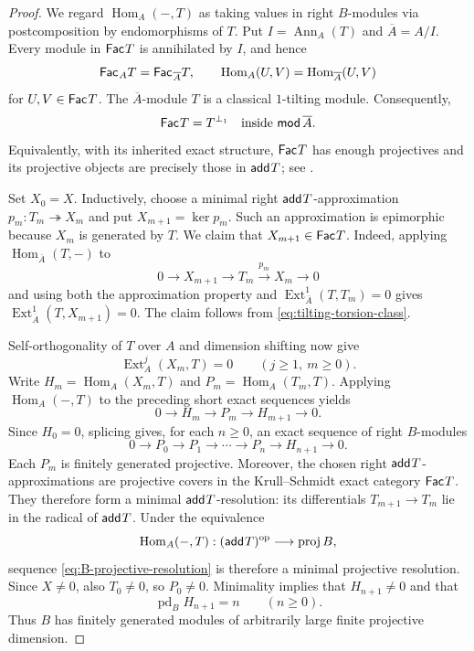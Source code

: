 \documentclass[a4paper,reqno]{amsart}
\theoremstyle{definition}
\newcommand{\Ext}{\operatorname{Ext}\nolimits}
\newcommand{\Hom}{\operatorname{Hom}\nolimits}
\newcommand{\Ann}{\operatorname{Ann}\nolimits}
\newcommand{\add}{\mathsf{add}\hspace{.01in}}
\newcommand{\Fac}{\mathsf{Fac}\hspace{.01in}}
\numberwithin{equation}{section}
\begin{document}
\begin{proof}
We regard $\Hom_A(-,T)$ as taking values in right $B$-modules via
postcomposition by endomorphisms of $T$.
Put $I=\Ann_A(T)$ and $\overline A=A/I$. Every module in $\Fac T$
is annihilated by $I$, and hence
\[
       \Fac_A T=\Fac_{\overline A}T,
       \qquad
       \Hom_A(U,V)=\Hom_{\overline A}(U,V)
\]
for $U,V\in\Fac T$. The $\overline A$-module $T$ is a classical
$1$-tilting module. Consequently,
\begin{equation}\label{eq:tilting-torsion-class}
        \Fac T=T^{\perp_1}
        \quad\text{inside }\mathsf{mod}\,\overline A.
\end{equation}
Equivalently, with its inherited exact structure, $\Fac T$ has enough
projectives and its projective objects are precisely those in
$\add T$; see \cite[Lemma~2.3]{CLZZ}.

Set $X_0=X$. Inductively, choose a minimal right
$\add T$-approximation $p_m:T_m\twoheadrightarrow X_m$ and put
$X_{m+1}=\ker p_m$.  Such an approximation is epimorphic because
$X_m$ is generated by $T$.  We claim that $X_{m+1}\in\Fac T$.
Indeed, applying $\Hom_{\overline A}(T,-)$ to
\[
0\longrightarrow X_{m+1}\longrightarrow T_m
 \xrightarrow{p_m}X_m\longrightarrow0
\]
and using both the approximation property and
$\Ext^1_{\overline A}(T,T_m)=0$ gives
$\Ext^1_{\overline A}(T,X_{m+1})=0$. The claim follows from
\eqref{eq:tilting-torsion-class}.

Self-orthogonality of $T$ over $A$ and dimension shifting now give
\[
             \Ext_A^j(X_m,T)=0\qquad(j\geq1,\ m\geq0).
\]
Write $H_m=\Hom_A(X_m,T)$ and $P_m=\Hom_A(T_m,T)$. Applying
$\Hom_A(-,T)$ to the preceding short exact sequences yields
\[
             0\longrightarrow H_m\longrightarrow P_m
             \longrightarrow H_{m+1}\longrightarrow0.
\]
Since $H_0=0$, splicing gives, for each $n\geq0$, an exact sequence
of right $B$-modules
\begin{equation}\label{eq:B-projective-resolution}
0\longrightarrow P_0\longrightarrow P_1\longrightarrow\cdots
 \longrightarrow P_n\longrightarrow H_{n+1}\longrightarrow0.
\end{equation}
Each $P_m$ is finitely generated projective. Moreover, the chosen
right $\add T$-approximations are projective covers in the
Krull--Schmidt exact category $\Fac T$. They therefore form a
minimal $\add T$-resolution: its differentials
$T_{m+1}\to T_m$ lie in the radical of $\add T$.
Under the equivalence
\[
       \Hom_A(-,T):(\add T)^{\rm op}\longrightarrow
                    \operatorname{proj}B,
\]
sequence \eqref{eq:B-projective-resolution} is therefore a minimal
projective resolution. Since $X\neq0$, also $T_0\neq0$, so
$P_0\neq0$. Minimality implies that $H_{n+1}\neq0$ and that
\[
       \operatorname{pd}_{B}H_{n+1}=n\qquad(n\geq0).
\]
Thus $B$ has finitely generated modules of arbitrarily large finite
projective dimension.
\end{proof}
\end{document}
